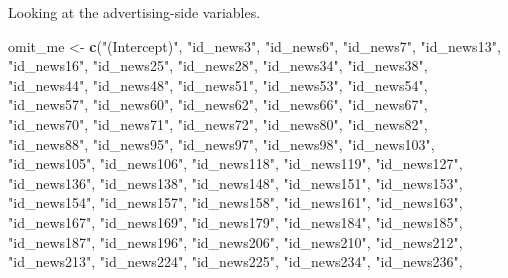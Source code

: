 \documentclass[
]{book}
\newenvironment{Shaded}{\begin{snugshade}}{\end{snugshade}}
\newcommand{\KeywordTok}[1]{\textcolor[rgb]{0.13,0.29,0.53}{\textbf{#1}}}
\newcommand{\NormalTok}[1]{#1}
\newcommand{\StringTok}[1]{\textcolor[rgb]{0.31,0.60,0.02}{#1}}
\begin{document}
Looking at the advertising-side variables.

\begin{Shaded}
\begin{Highlighting}[]
\NormalTok{omit_me <-}\StringTok{ }\KeywordTok{c}\NormalTok{(}\StringTok{"(Intercept)"}\NormalTok{, }\StringTok{"id_news3"}\NormalTok{, }\StringTok{"id_news6"}\NormalTok{, }\StringTok{"id_news7"}\NormalTok{, }\StringTok{"id_news13"}\NormalTok{, }
             \StringTok{"id_news16"}\NormalTok{, }\StringTok{"id_news25"}\NormalTok{, }\StringTok{"id_news28"}\NormalTok{, }\StringTok{"id_news34"}\NormalTok{, }\StringTok{"id_news38"}\NormalTok{, }
             \StringTok{"id_news44"}\NormalTok{, }\StringTok{"id_news48"}\NormalTok{, }\StringTok{"id_news51"}\NormalTok{, }\StringTok{"id_news53"}\NormalTok{, }\StringTok{"id_news54"}\NormalTok{, }
             \StringTok{"id_news57"}\NormalTok{, }\StringTok{"id_news60"}\NormalTok{, }\StringTok{"id_news62"}\NormalTok{, }\StringTok{"id_news66"}\NormalTok{, }\StringTok{"id_news67"}\NormalTok{, }
             \StringTok{"id_news70"}\NormalTok{, }\StringTok{"id_news71"}\NormalTok{, }\StringTok{"id_news72"}\NormalTok{, }\StringTok{"id_news80"}\NormalTok{, }\StringTok{"id_news82"}\NormalTok{, }
             \StringTok{"id_news88"}\NormalTok{, }\StringTok{"id_news95"}\NormalTok{, }\StringTok{"id_news97"}\NormalTok{, }\StringTok{"id_news98"}\NormalTok{, }\StringTok{"id_news103"}\NormalTok{, }
             \StringTok{"id_news105"}\NormalTok{, }\StringTok{"id_news106"}\NormalTok{, }\StringTok{"id_news118"}\NormalTok{, }\StringTok{"id_news119"}\NormalTok{, }\StringTok{"id_news127"}\NormalTok{, }
             \StringTok{"id_news136"}\NormalTok{, }\StringTok{"id_news138"}\NormalTok{, }\StringTok{"id_news148"}\NormalTok{, }\StringTok{"id_news151"}\NormalTok{, }\StringTok{"id_news153"}\NormalTok{, }
             \StringTok{"id_news154"}\NormalTok{, }\StringTok{"id_news157"}\NormalTok{, }\StringTok{"id_news158"}\NormalTok{, }\StringTok{"id_news161"}\NormalTok{, }\StringTok{"id_news163"}\NormalTok{, }
             \StringTok{"id_news167"}\NormalTok{, }\StringTok{"id_news169"}\NormalTok{, }\StringTok{"id_news179"}\NormalTok{, }\StringTok{"id_news184"}\NormalTok{, }\StringTok{"id_news185"}\NormalTok{, }
             \StringTok{"id_news187"}\NormalTok{, }\StringTok{"id_news196"}\NormalTok{, }\StringTok{"id_news206"}\NormalTok{, }\StringTok{"id_news210"}\NormalTok{, }\StringTok{"id_news212"}\NormalTok{, }
             \StringTok{"id_news213"}\NormalTok{, }\StringTok{"id_news224"}\NormalTok{, }\StringTok{"id_news225"}\NormalTok{, }\StringTok{"id_news234"}\NormalTok{, }\StringTok{"id_news236"}\NormalTok{, }

\end{Highlighting}
\end{Shaded}
\end{document}
